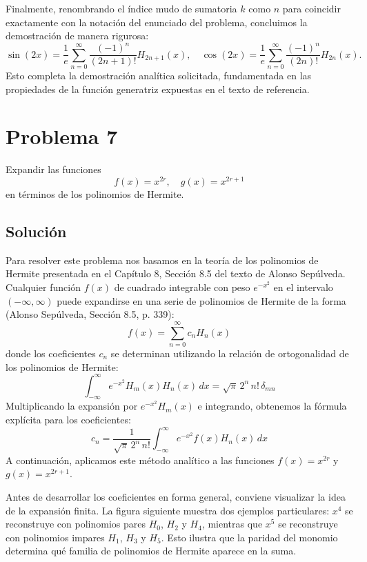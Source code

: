 \documentclass[a4paper]{article}
\begin{document}
Finalmente, renombrando el índice mudo de sumatoria $k$ como $n$ para coincidir exactamente con la notación del enunciado del problema, concluimos la demostración de manera rigurosa:
$$
\sin(2x) = \frac{1}{e} \sum_{n=0}^{\infty} \frac{(-1)^n}{(2n+1)!} H_{2n+1}(x), \quad \cos(2x) = \frac{1}{e} \sum_{n=0}^{\infty} \frac{(-1)^n}{(2n)!} H_{2n}(x).
$$
Esto completa la demostración analítica solicitada, fundamentada en las propiedades de la función generatriz expuestas en el texto de referencia.

\section{Problema 7}
Expandir las funciones
$$
f(x) = x^{2r}, \quad g(x) = x^{2r+1}
$$
en términos de los polinomios de Hermite.

\subsection{Solución}
Para resolver este problema nos basamos en la teoría de los polinomios de Hermite presentada en el Capítulo 8, Sección 8.5 del texto de Alonso Sepúlveda. Cualquier función $f(x)$ de cuadrado integrable con peso $e^{-x^2}$ en el intervalo $(-\infty, \infty)$ puede expandirse en una serie de polinomios de Hermite de la forma (Alonso Sepúlveda, Sección 8.5, p. 339):
$$
f(x) = \sum_{n=0}^{\infty} c_n H_n(x)
$$
donde los coeficientes $c_n$ se determinan utilizando la relación de ortogonalidad de los polinomios de Hermite:
$$
\int_{-\infty}^{\infty} e^{-x^2} H_m(x) H_n(x) \, dx = \sqrt{\pi} \, 2^n \, n! \, \delta_{mn}
$$
Multiplicando la expansión por $e^{-x^2} H_m(x)$ e integrando, obtenemos la fórmula explícita para los coeficientes:
$$
c_n = \frac{1}{\sqrt{\pi} \, 2^n \, n!} \int_{-\infty}^{\infty} e^{-x^2} f(x) H_n(x) \, dx
$$
A continuación, aplicamos este método analítico a las funciones $f(x) = x^{2r}$ y $g(x) = x^{2r+1}$.


Antes de desarrollar los coeficientes en forma general, conviene visualizar la idea de la expansión finita. La figura siguiente muestra dos ejemplos particulares: $x^4$ se reconstruye con polinomios pares $H_0$, $H_2$ y $H_4$, mientras que $x^5$ se reconstruye con polinomios impares $H_1$, $H_3$ y $H_5$. Esto ilustra que la paridad del monomio determina qué familia de polinomios de Hermite aparece en la suma.
\end{document}
